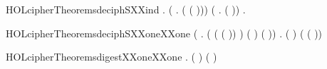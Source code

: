\begin{SaveVerbatim}{HOLcipherTheoremsdeciphSXXind}
\HOLTokenTurnstile{} \HOLSymConst{\HOLTokenForall{}}.
     (\HOLSymConst{\HOLTokenForall{}}  .   (  ( ))) \HOLSymConst{\HOLTokenConj{}}
     (\HOLSymConst{\HOLTokenForall{}} .   (  )) \HOLSymConst{\HOLTokenImp{}}
     \HOLSymConst{\HOLTokenForall{}} .   
\end{SaveVerbatim}
\newcommand{\HOLcipherTheoremsdeciphSXXind}{\UseVerbatim{HOLcipherTheoremsdeciphSXXind}}
\begin{SaveVerbatim}{HOLcipherTheoremsdeciphSXXoneXXone}
\HOLTokenTurnstile{} (\HOLSymConst{\HOLTokenForall{}}   .
      (  (  ( )) \HOLSymConst{=}  ) \HOLSymConst{\HOLTokenEquiv{}}
      ( \HOLSymConst{=} ) \HOLSymConst{\HOLTokenConj{}} ( \HOLSymConst{=} )) \HOLSymConst{\HOLTokenConj{}}
   \HOLSymConst{\HOLTokenForall{}}  .
     (   \HOLSymConst{=}  ) \HOLSymConst{\HOLTokenEquiv{}}
     ( \HOLSymConst{=}   ( ))
\end{SaveVerbatim}
\newcommand{\HOLcipherTheoremsdeciphSXXoneXXone}{\UseVerbatim{HOLcipherTheoremsdeciphSXXoneXXone}}
\begin{SaveVerbatim}{HOLcipherTheoremsdigestXXoneXXone}
\HOLTokenTurnstile{} \HOLSymConst{\HOLTokenForall{}} . (  \HOLSymConst{=}  ) \HOLSymConst{\HOLTokenEquiv{}} ( \HOLSymConst{=} )
\end{SaveVerbatim}
